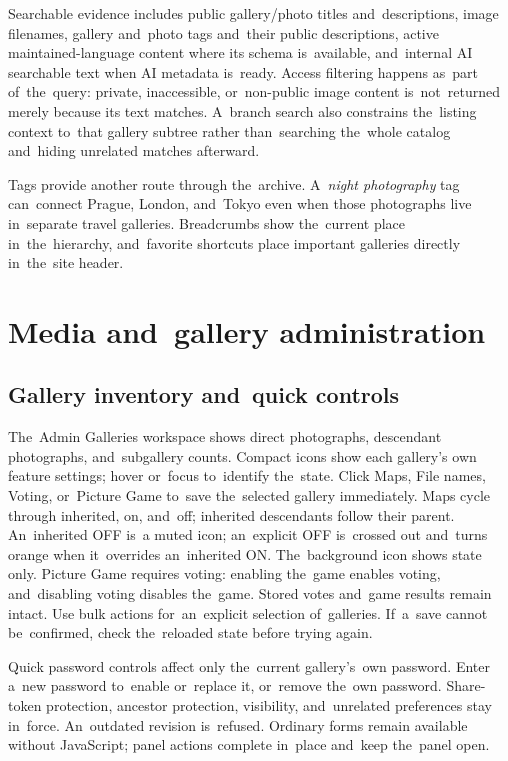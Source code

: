 \documentclass[11pt,a4paper]{article}
\begin{document}
Searchable evidence includes public gallery/photo titles and~descriptions, image
filenames, gallery and~photo tags and~their public descriptions, active
maintained-language content where its schema is~available, and~internal AI
searchable text when AI metadata is~ready. Access filtering happens as~part
of~the~query: private, inaccessible, or~non-public image content is~not~returned
merely because its text matches. A~branch search also constrains the~listing
context to~that gallery subtree rather than~searching the~whole catalog
and~hiding unrelated matches afterward.

Tags provide another route through the~archive. A~\emph{night photography} tag
can~connect Prague, London, and~Tokyo even when those photographs live
in~separate travel galleries. Breadcrumbs show the~current place
in~the~hierarchy, and~favorite shortcuts place important galleries directly
in~the~site header.

\section{Media and~gallery administration}
\label{sec:admin}

\subsection{Gallery inventory and~quick controls}
The~Admin Galleries workspace shows direct photographs, descendant photographs,
and~subgallery counts. Compact icons show each gallery's own feature settings;
hover or~focus to~identify the~state. Click Maps, File names, Voting, or~Picture
Game to~save the~selected gallery immediately. Maps cycle through inherited,
on, and~off; inherited descendants follow their parent. An~inherited OFF is~a
muted icon; an~explicit OFF is~crossed out and~turns orange when it~overrides
an~inherited ON. The~background icon
shows state only. Picture Game requires voting: enabling the~game enables voting,
and~disabling voting disables the~game. Stored votes and~game results remain
intact. Use bulk actions for~an~explicit selection of~galleries. If~a~save
cannot be~confirmed, check the~reloaded state before trying again.

Quick password controls affect only the~current gallery's~own password. Enter
a~new password to~enable or~replace it, or~remove the~own password. Share-token
protection, ancestor protection, visibility, and~unrelated preferences stay
in~force. An~outdated revision is~refused. Ordinary forms remain available
without JavaScript; panel actions complete in~place and~keep the~panel open.
\end{document}
